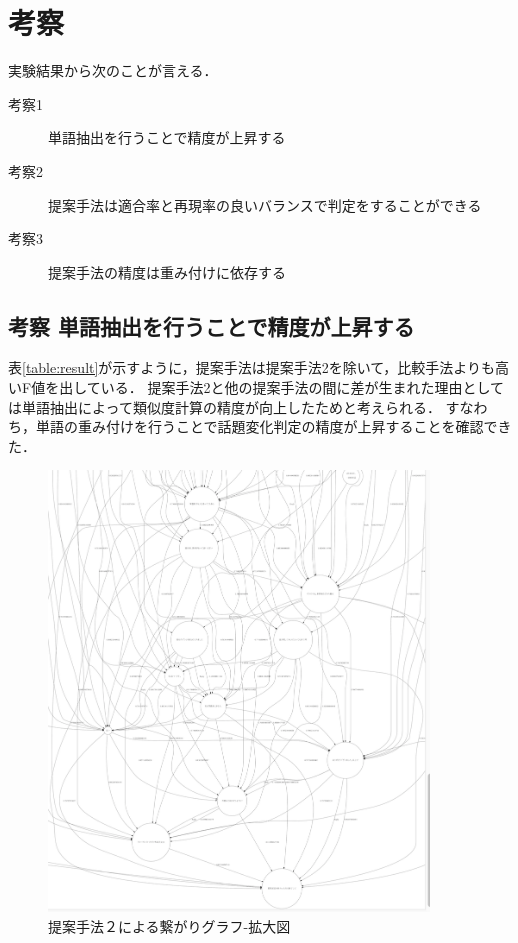 \section{考察}
\label{exp:consideration}
実験結果から次のことが言える．\\
\begin{description} 
  \item[考察1] 単語抽出を行うことで精度が上昇する
  \item[考察2] 提案手法は適合率と再現率の良いバランスで判定をすることができる
  \item[考察3] 提案手法の精度は重み付けに依存する
\end{description}
\subsection*{考察 単語抽出を行うことで精度が上昇する}
表\ref{table:result}が示すように，提案手法は提案手法2を除いて，比較手法よりも高いF値を出している．
提案手法2と他の提案手法の間に差が生まれた理由としては単語抽出によって類似度計算の精度が向上したためと考えられる．
すなわち，単語の重み付けを行うことで話題変化判定の精度が上昇することを確認できた．
\begin{figure}[htbp]
 \begin{center}
  \includegraphics[width=0.9\textwidth]{../images/5.Experiment/Graph=FastText-Plain-cut2.png}
  \caption{提案手法２による繋がりグラフ-拡大図}
  \label{Fig:GraphFT-Plain}
  \vspace{-10pt}
 \end{center}
\end{figure}

